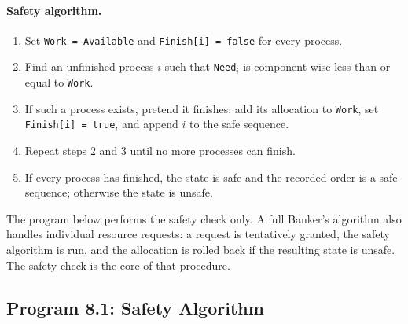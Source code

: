 \paragraph{Safety algorithm.}
\begin{enumerate}
    \item Set \texttt{Work = Available} and \texttt{Finish[i] = false} for every process.
    \item Find an unfinished process $i$ such that \texttt{Need}$_i$ is component-wise less than or equal to \texttt{Work}.
    \item If such a process exists, pretend it finishes: add its allocation to \texttt{Work}, set \texttt{Finish[i] = true}, and append $i$ to the safe sequence.
    \item Repeat steps 2 and 3 until no more processes can finish.
    \item If every process has finished, the state is safe and the recorded order is a safe sequence; otherwise the state is unsafe.
\end{enumerate}

The program below performs the safety check only. A full Banker's algorithm also handles individual resource requests: a request is tentatively granted, the safety algorithm is run, and the allocation is rolled back if the resulting state is unsafe. The safety check is the core of that procedure.

\subsection{Program 8.1: Safety Algorithm}



